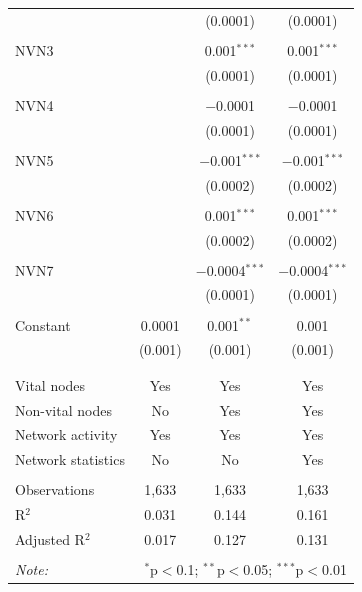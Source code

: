 \begin{table}[!htbp]
\begin{tabular}{@{\extracolsep{5pt}}lccc}
  &  & (0.0001) & (0.0001) \\ 
  & & & \\ 
 NVN3 &  & 0.001$^{***}$ & 0.001$^{***}$ \\ 
  &  & (0.0001) & (0.0001) \\ 
  & & & \\ 
 NVN4 &  & $-$0.0001 & $-$0.0001 \\ 
  &  & (0.0001) & (0.0001) \\ 
  & & & \\ 
 NVN5 &  & $-$0.001$^{***}$ & $-$0.001$^{***}$ \\ 
  &  & (0.0002) & (0.0002) \\ 
  & & & \\ 
 NVN6 &  & 0.001$^{***}$ & 0.001$^{***}$ \\ 
  &  & (0.0002) & (0.0002) \\ 
  & & & \\ 
 NVN7 &  & $-$0.0004$^{***}$ & $-$0.0004$^{***}$ \\ 
  &  & (0.0001) & (0.0001) \\ 
  & & & \\ 
 Constant & 0.0001 & 0.001$^{**}$ & 0.001 \\ 
  & (0.001) & (0.001) & (0.001) \\ 
  & & & \\ 
\hline \\[-1.8ex] 
Vital nodes & Yes & Yes & Yes \\ 
Non-vital nodes & No & Yes & Yes \\ 
Network activity & Yes & Yes & Yes \\ 
Network statistics & No & No & Yes \\ 
\hline &  &  &  \\ 
Observations & 1,633 & 1,633 & 1,633 \\ 
R$^{2}$ & 0.031 & 0.144 & 0.161 \\ 
Adjusted R$^{2}$ & 0.017 & 0.127 & 0.131 \\ 
\hline 
\hline \\[-1.8ex] 
\textit{Note:}  & \multicolumn{3}{r}{$^{*}$p$<$0.1; $^{**}$p$<$0.05; $^{***}$p$<$0.01} \\ 
\end{tabular} 
\end{table} 
